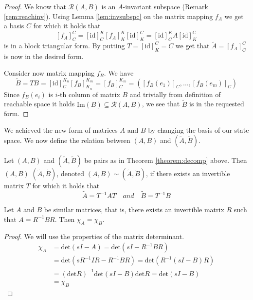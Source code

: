 \begin{proof}
	We know that $\mathcal{R}(A,B)$ is an $A$-invariant subspace (Remark \ref{rem:reachinv}). Using Lemma \ref{lem:invsubspc} on the matrix mapping $f_A$ we get a basis $C$ for which it holds that 
	$$[f_A]^C_C=[\text{id}]^K_C[f_A]^K_K[\text{id}]^C_K=[\text{id}]^K_CA[\text{id}]^C_K$$ 
	is in a block triangular form. By putting $T=[\text{id}]^C_K=C$ we get that $\widetilde{A}=[f_A]^C_C$ is now in the desired form.

	Consider now matrix mapping $f_B$. We have $$\widetilde{B}=TB=[\text{id}]^{K_n}_C[f_B]^{K_m}_{K_n}=[f_B]^{K_m}_C=([f_B(e_1)]_C,\ldots,[f_B(e_m)]_C)$$ Since $f_B(e_i)$ is $i$-th column of matrix $B$ and trivially from definition of reachable space it holds $\text{Im}(B)\subseteq \mathcal{R}(A,B)$, we see that $\widetilde{B}$ is in the requested form.
\end{proof}

We achieved the new form of matrices $A$ and $B$ by changing the basis of our state space. We now define the relation between $(A,B)$ and $(\widetilde{A},\widetilde{B}).$

\begin{definition}
	Let $(A,B)$ and $(\widetilde{A},\widetilde{B})$ be pairs as in Theorem \ref{theorem:decomp} above. Then $(A,B)$  $(\widetilde{A},\widetilde{B})$, denoted $(A,B) \sim (\widetilde{A},\widetilde{B})$, if there exists an invertible matrix $T$ for which it holds that $$\widetilde{A}=T^{-1}AT\quad and\quad\widetilde{B}=T^{-1}B$$
\end{definition}

\begin{lemma}
	\label{lem:simMatrices}
	Let $A$ and $B$ be similar matrices, that is, there exists an invertible matrix $R$ such that $A=R^{-1}BR$. Then $\chi_A=\chi_B$.
\end{lemma}

\begin{proof}
	We will use the properties of the matrix determinant.
	\begin{align*}
		\chi_A&=\text{det}(sI-A)=\text{det}(sI-R^{-1}BR) \\
		&=\text{det}(sR^{-1}IR-R^{-1}BR)=\text{det}(R^{-1}(sI-B)R) \\
		&=(\text{det}R)^{-1}\text{det}(sI-B)\text{det}R=\text{det}(sI-B) \\
		&=\chi_B
	\end{align*}
\end{proof}

